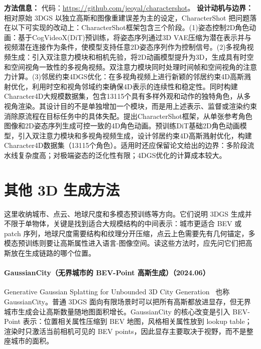 \textbf{方法信息：} 代码：\url{https://github.com/jeoyal/charactershot}。
\textbf{设计动机与边界：} 相对原始 3DGS 以独立高斯和图像重建误差为主的设定，CharacterShot 把问题落在以下可实现的改动上：CharacterShot框架包含三个阶段。(1)姿态控制2D角色动画：基于CogVideoX(DiT)预训练，将姿态序列通过3D VAE压缩为潜在表示并与视频潜在连接作为条件，使模型支持任意2D姿态序列作为控制信号。(2)多视角视频生成：引入双注意力模块和相机先验，将2D动画模型提升为3D，生成具有时空和空间视角一致性的多视角视频。双注意力模块同时处理时间帧和空间视角的注意力计算。(3)邻居约束4DGS优化：在多视角视频上进行新颖的邻居约束4D高斯溅射优化，利用时空和视角邻域约束确保4D表示的连续性和稳定性。同时构建Character4D大规模数据集，包含13115个具有多样外观和动作的独特角色，从多视角渲染。其设计目的不是单独增加一个模块，而是用上述表示、监督或渲染约束消除原流程在目标任务中的具体失配。提出CharacterShot框架，从单张参考角色图像和2D姿态序列生成可控一致的4D角色动画。预训练DiT基础2D角色动画模型，引入双注意力模块和多视角视频生成，设计邻居约束4D高斯溅射优化，构建Character4D数据集（13115个角色）。适用时还应保留论文给出的边界：多阶段流水线复杂度高；对极端姿态的泛化性有限；4DGS优化的计算成本较大。

\section{其他 3D 生成方法}

这里收纳城市、点云、地球尺度和多模态预训练等方向。它们说明 3DGS 生成并不限于单物体，关键是找到适合大规模结构的中间表示：城市更适合 BEV 或 patch 序列，地球尺度需要结构和纹理分开压缩，点云上色需要先有几何锚定，多模态预训练则要让高斯属性进入语言-图像空间。读这些方法时，应先问它们把高斯放在生成链路的哪个位置。
\paragraph{GaussianCity（无界城市的 BEV-Point 高斯生成）（2024.06）}
Generative Gaussian Splatting for Unbounded 3D City Generation~\cite{2406_06526} 也称 GaussianCity。普通 3DGS 面向有限场景时可以把所有高斯都放进显存，但无界城市生成会让高斯数量随地图面积增长。GaussianCity 的核心改变是引入 BEV-Point 表示：位置相关属性压缩到 BEV 地图，风格相关属性放到 lookup table；渲染时只激活当前相机可见的 BEV points，因此显存主要取决于视野，而不是整座城市的面积。

